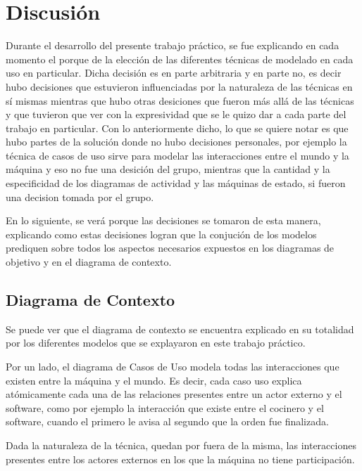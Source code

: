 \documentclass[a4paper,10pt]{article}
\begin{document}
\section*{Discusi\'on}

Durante el desarrollo del presente trabajo pr\'actico, se fue explicando en cada momento el porque de la elecci\'on de las diferentes
t\'ecnicas de modelado en cada uso en particular. Dicha decisi\'on es en parte arbitraria y en parte no, es decir hubo decisiones que estuvieron
influenciadas por la naturaleza de las t\'ecnicas en s\'i mismas mientras que hubo otras desiciones que fueron m\'as all\'a de las t\'ecnicas
y que tuvieron que ver con la expresividad que se le quizo dar a cada parte del trabajo en particular. Con lo anteriormente dicho, lo que se quiere notar
es que hubo partes de la soluci\'on donde no hubo decisiones personales, por ejemplo la t\'ecnica de casos de uso sirve para modelar las interacciones
entre el mundo y la m\'aquina y eso no fue una desici\'on del grupo, mientras que la cantidad y la especificidad de los diagramas de actividad
y las m\'aquinas de estado, si fueron una decision tomada por el grupo.

En lo siguiente, se ver\'a porque las decisiones se tomaron de esta manera, explicando como estas decisiones logran que la conjuci\'on
de los modelos prediquen sobre todos los aspectos necesarios expuestos en los diagramas de objetivo y en el diagrama de contexto.

\subsection*{Diagrama de Contexto}
Se puede ver que el diagrama de contexto se encuentra explicado en su totalidad por los diferentes modelos que se explayaron en este trabajo pr\'actico.

Por un lado, el diagrama de Casos de Uso modela todas las interacciones que existen entre la m\'aquina y el mundo. Es decir, cada caso uso explica
at\'omicamente cada una de las relaciones presentes entre un actor externo y el software, como por ejemplo la interacci\'on que existe entre
el cocinero y el software, cuando el primero le avisa al segundo que la orden fue finalizada. 

Dada la naturaleza de la t\'ecnica, quedan por fuera de la misma, las interacciones presentes entre los actores externos en los que la m\'aquina
no tiene participaci\'on. 
\end{document}
